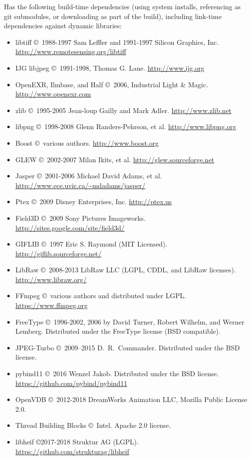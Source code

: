 \noindent \product Has the following build-time dependencies (using
system installs, referencing as git submodules, or downloading as part of
the build), including link-time dependencies
against dynamic libraries:

\begin{itemize}
\item {\cf libtiff} \copyright\ 1988-1997 Sam Leffler and 1991-1997 Silicon
Graphics, Inc. \\ \url{http://www.remotesensing.org/libtiff}
\item {\cf IJG libjpeg} \copyright\ 1991-1998, Thomas G. Lane.  \url{http://www.ijg.org}
\item OpenEXR, Ilmbase, and Half \copyright\ 2006, Industrial Light \& Magic.\\
\url{http://www.openexr.com}
\item {\cf zlib} \copyright\ 1995-2005 Jean-loup Gailly and Mark Adler. 
\url{http://www.zlib.net}
\item {\cf libpng} \copyright\ 1998-2008 Glenn Randers-Pehrson, et al.  
\url{http://www.libpng.org}
\item Boost \copyright\ various authors. \url{http://www.boost.org}
\item GLEW \copyright\ 2002-2007 Milan Ikits, et al. 
\url{http://glew.sourceforge.net}
\item Jasper \copyright\ 2001-2006 Michael David Adams, et al. \\
\url{http://www.ece.uvic.ca/~mdadams/jasper/}
\item Ptex \copyright\ 2009 Disney Enterprises, Inc.
\url{http://ptex.us}
\item Field3D \copyright\ 2009 Sony Pictures Imageworks.
\url{http://sites.google.com/site/field3d/}
\item {\cf GIFLIB} \copyright\ 1997 Eric S. Raymond (MIT Licensed).
\url{http://giflib.sourceforge.net/}
\item {\cf LibRaw} \copyright\ 2008-2013 LibRaw LLC (LGPL, CDDL, and LibRaw
    licenses). \\ \url{http://www.libraw.org/}
\item {\cf FFmpeg} \copyright\ various authors and distributed under LGPL.
   \url{https://www.ffmpeg.org}
\item {\cf FreeType} \copyright\ 1996-2002, 2006 by David Turner, Robert
    Wilhelm, and Werner Lemberg. Distributed under the FreeType license (BSD compatible).
\item {\cf JPEG-Turbo} \copyright\ 2009--2015 D.\ R.\ Commander. Distributed
    under the BSD license.
\item {\cf pybind11} \copyright\ 2016 Wenzel Jakob. Distributed under the
    BSD license. \url{https://github.com/pybind/pybind11}
\item {\cf OpenVDB} \copyright\ 2012-2018 DreamWorks Animation LLC,
Mozilla Public License 2.0.
\item {\cf Thread Building Blocks} \copyright\ Intel. Apache 2.0 license.
\item {\cf libheif} \copyright 2017-2018 Struktur AG (LGPL). \\
    \url{https://github.com/strukturag/libheif}

\end{itemize}



\chapwidthend
